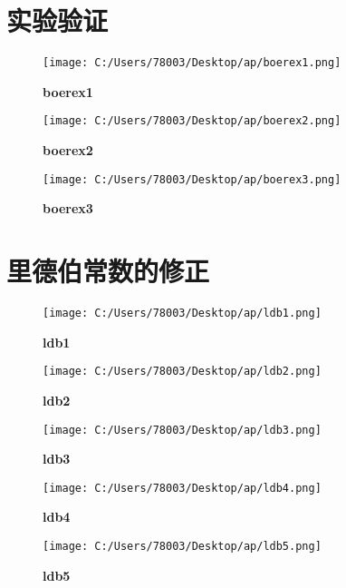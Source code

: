 \documentclass[UTF8]{report}
\theoremstyle{MyLineTheoremStyle} %
\theoremstyle{MyBlockTheoremStyle} %
\theoremstyle{MySubsubsectionStyle} %
\begin{document}
\cleardoublepage
\section{实验验证}

\begin{figure}[ht]
    \centering
    \texttt{[image: C:/Users/78003/Desktop/ap/boerex1.png]}
    \caption{\textbf{boerex1}}
    \label{fig:boerex1}
\end{figure}

\begin{figure}[ht]
    \centering
    \texttt{[image: C:/Users/78003/Desktop/ap/boerex2.png]}
    \caption{\textbf{boerex2}}
    \label{fig:boerex2}
\end{figure}

\begin{figure}[ht]
    \centering
    \texttt{[image: C:/Users/78003/Desktop/ap/boerex3.png]}
    \caption{\textbf{boerex3}}
    \label{fig:boerex3}
\end{figure}

\cleardoublepage
\section{里德伯常数的修正}

\begin{figure}[ht]
    \centering
    \texttt{[image: C:/Users/78003/Desktop/ap/ldb1.png]}
    \caption{\textbf{ldb1}}
    \label{fig:ldb1}
\end{figure}

\begin{figure}[ht]
    \centering
    \texttt{[image: C:/Users/78003/Desktop/ap/ldb2.png]}
    \caption{\textbf{ldb2}}
    \label{fig:ldb2}
\end{figure}

\begin{figure}[ht]
    \centering
    \texttt{[image: C:/Users/78003/Desktop/ap/ldb3.png]}
    \caption{\textbf{ldb3}}
    \label{fig:ldb3}
\end{figure}

\begin{figure}[ht]
    \centering
    \texttt{[image: C:/Users/78003/Desktop/ap/ldb4.png]}
    \caption{\textbf{ldb4}}
    \label{fig:ldb4}
\end{figure}

\begin{figure}[ht]
    \centering
    \texttt{[image: C:/Users/78003/Desktop/ap/ldb5.png]}
    \caption{\textbf{ldb5}}
    \label{fig:ldb5}
\end{figure}
\end{document}
